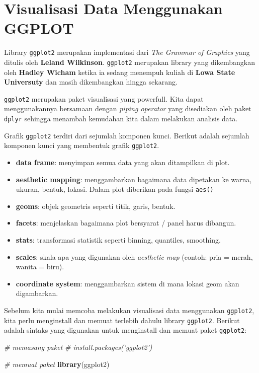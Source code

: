 \documentclass[]{book}
\newenvironment{Shaded}{\begin{snugshade}}{\end{snugshade}}
\newcommand{\KeywordTok}[1]{\textcolor[rgb]{0.13,0.29,0.53}{\textbf{#1}}}
\newcommand{\CommentTok}[1]{\textcolor[rgb]{0.56,0.35,0.01}{\textit{#1}}}
\newcommand{\NormalTok}[1]{#1}
\providecommand{\tightlist}{%
  \setlength{\itemsep}{0pt}\setlength{\parskip}{0pt}}
\begin{document}
\chapter{Visualisasi Data Menggunakan
GGPLOT}\label{visualisasi-data-menggunakan-ggplot}

Library \texttt{ggplot2} merupakan implementasi dari \emph{The Grammar
of Graphics} yang ditulis oleh \textbf{Leland Wilkinson}.
\texttt{ggplot2} merupakan library yang dikembangkan oleh \textbf{Hadley
Wicham} ketika ia sedang menempuh kuliah di \textbf{Lowa State
Universuty} dan masih dikembangkan hingga sekarang.

\texttt{ggplot2} merupakan paket visualisasi yang powerfull. Kita dapat
menggunakannya bersamaan dengan \emph{piping operator} yang disediakan
oleh paket \texttt{dplyr} sehingga menambah kemudahan kita dalam
melakukan analisis data.

Grafik \texttt{ggplot2} terdiri dari sejumlah komponen kunci. Berikut
adalah sejumlah komponen kunci yang membentuk grafik \texttt{ggplot2}.

\begin{itemize}
\tightlist
\item
  \textbf{data frame}: menyimpan semua data yang akan ditampilkan di
  plot.
\item
  \textbf{aesthetic mapping}: menggambarkan bagaimana data dipetakan ke
  warna, ukuran, bentuk, lokasi. Dalam plot diberikan pada fungsi
  \texttt{aes()}
\item
  \textbf{geoms}: objek geometris seperti titik, garis, bentuk.
\item
  \textbf{facets}: menjelaskan bagaimana plot bersyarat / panel harus
  dibangun.
\item
  \textbf{stats}: transformasi statistik seperti binning, quantiles,
  smoothing.
\item
  \textbf{scales}: skala apa yang digunakan oleh \emph{aesthetic map}
  (contoh: pria = merah, wanita = biru).
\item
  \textbf{coordinate system}: menggambarkan sistem di mana lokasi geom
  akan digambarkan.
\end{itemize}

Sebelum kita mulai memcoba melakukan visualisasi data menggunakan
\texttt{ggplot2}, kita perlu menginstall dan memuat terlebih dahulu
library \texttt{ggplot2}. Berikut adalah sintaks yang digunakan untuk
menginstall dan memuat paket \texttt{ggplot2}:

\begin{Shaded}
\begin{Highlighting}[]
\CommentTok{# memasang paket}
\CommentTok{# install.packages('ggplot2')}

\CommentTok{# memuat paket}
\KeywordTok{library}\NormalTok{(ggplot2)}
\end{Highlighting}
\end{Shaded}
\end{document}
